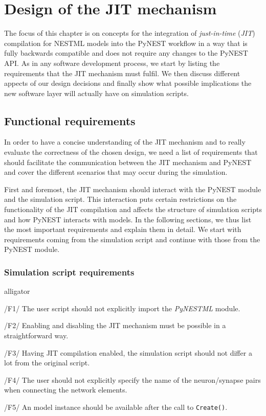 
\chapter{Design of the JIT mechanism}
\label{chap:jit}

The focus of this chapter is on concepts for the integration of \emph{just-in-time} (\emph{JIT}) compilation for NESTML models into the PyNEST workflow in a way that is fully backwards compatible and does not require any changes to the PyNEST API. As in any software development process, we start by listing the requirements that the JIT mechanism must fulfil. We then discuss different appects of our design decisions and finally show what possible implications the new software layer will actually have on simulation scripts.

\section{Functional requirements}

In order to have a concise understanding of the JIT mechanism and to really evaluate the correctness of the chosen design, we need a list of requirements that should facilitate the communication between the JIT mechanism and PyNEST and cover the different scenarios that may occur during the simulation.

First and foremost, the JIT mechanism should interact with the PyNEST module and the simulation script. This interaction puts certain restrictions on the functionality of the JIT compilation and affects the structure of simulation scripts and how PyNEST interacts with models. In the following sections, we thus list the most important requirements and explain them in detail. We start with requirements coming from the simulation script and continue with those from the PyNEST module.

\subsection*{Simulation script requirements}

\begin{labeling}{alligator}
   \item[/F1/] The user script should not explicitly import the \emph{PyNESTML} module.
   \item[/F2/] Enabling and disabling the JIT mechanism must be possible in a straightforward way.
   \item[/F3/] Having JIT compilation enabled, the simulation script should not differ a lot from the original script.
   \item[/F4/]\label{req:F4} The user should not explicitly specify the name of the neuron/synapse pairs when connecting the network elements.
   \item[/F5/] An model instance should be available after the call to \texttt{Create()}.
\end{labeling}

